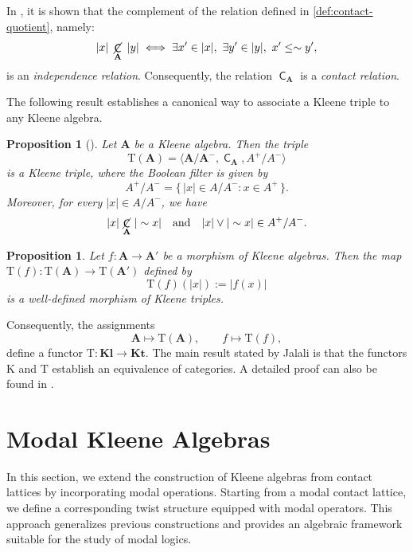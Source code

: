 \documentclass{article}
\newtheorem{proposition}[theorem]{Proposition}
\DeclareMathOperator{\con}{\mathsf{C}}
\DeclareMathOperator{\notcon}{\cancel{ \con}}
\newcommand{\A}{\mathbf{A}}
\begin{document}
In \cite{jalali}, it is shown that the complement of the relation defined in \eqref{def:contact-quotient}, namely:
\begin{equation}
    \label{def:independence}
    |x|\ \notcon_\A\ |y| \;\Longleftrightarrow\;
    \exists x' \in |x|,\ \exists y' \in |y|,\ x' \leq \sim y',
\end{equation}
is an \emph{independence relation}. Consequently, the relation $\con_\A$ is a \emph{contact relation}.

The following result establishes a canonical way to associate a Kleene triple to any Kleene algebra.

\begin{proposition}[\cite{jalali}]
\label{prop:Tfunctor}
Let $\A$ be a Kleene algebra. Then the triple \[
\mathrm{T}(\A)= \langle \mathbf{A / A^{-}} , \con_\A, A^{+}  / A^{-} \rangle\]
is a Kleene triple, where the Boolean filter is given by
\[
A^{+}  / A^{-} = \{\, |x| \in A / A^{-} : x \in A^{+}  \,\}.
\]
Moreover, for every $|x| \in A / A^{-}$, we have
\[
|x|\, \notcon_\A\, |\sim x| \quad \text{and} \quad |x| \vee |\sim x| \in A^{+}  / A^{-}.
\]
\end{proposition}

\begin{proposition}
\label{prop:Tfunctor-mor}
Let $f \colon \A \to \A'$ be a morphism of Kleene algebras. Then the map $\mathrm{T}(f) \colon \mathrm{T}(\A) \to \mathrm{T}(\A')$ defined by
\[
\mathrm{T}(f)(|x|) := |f(x)|
\]
is a well-defined morphism of Kleene triples.
\end{proposition}

Consequently, the assignments
\[
\A\mapsto\mathrm{T}(\A),
\qquad
f\mapsto\mathrm{T}(f),
\]
define a functor $\mathrm{T}:\mathbf{Kl}\to\mathbf{Kt}$. The main result stated by Jalali \cite{jalali} is that the functors $\mathrm{K}$ and $\mathrm{T}$ establish an equivalence of categories. A detailed proof can also be found in \cite{viglizzo99algebras}.

\section{Modal Kleene Algebras}
\label{sec:modal}

In this section, we extend the construction of Kleene algebras from contact lattices by incorporating modal operations. Starting from a modal contact lattice, we define a corresponding twist structure equipped with modal operators. This approach generalizes previous constructions and provides an algebraic framework suitable for the study of modal logics.
\end{document}
